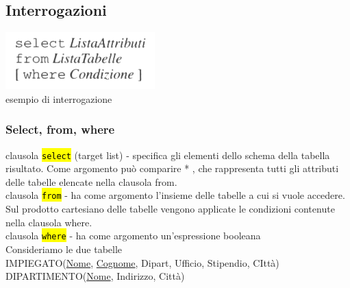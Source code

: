 \documentclass[a4paper]{article}
\begin{document}
\subsection{Interrogazioni}
\begin{center}
      \includegraphics[scale=0.5]{img/sql1.png}\\
      esempio di interrogazione
\end{center}

\subsubsection{Select, from, where}
clausola \hl{\texttt{select}} (target list) - specifica gli elementi dello schema della tabella risultato. Come argomento può comparire * , che rappresenta tutti gli attributi delle tabelle elencate nella clausola from.\medskip\\
%
clausola \hl{\texttt{from}} - ha come argomento l’insieme delle tabelle a cui si vuole accedere. Sul prodotto cartesiano delle tabelle vengono applicate le condizioni contenute nella clausola where.\medskip\\
%
clausola \hl{\texttt{where}} - ha come argomento un’espressione booleana\medskip\medskip\medskip\\
%
Consideriamo le due tabelle\\
IMPIEGATO(\underline{Nome}, \underline{Cognome}, Dipart, Ufficio, Stipendio, CIttà)\\
DIPARTIMENTO(\underline{Nome}, Indirizzo, Città)
\end{document}
